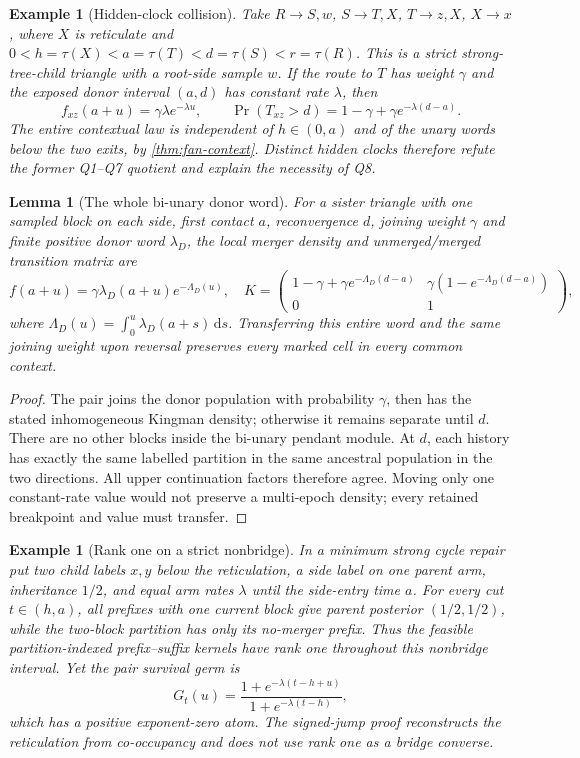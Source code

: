 \documentclass[11pt]{article}
\newtheorem{lemma}[theorem]{Lemma}
\newtheorem{example}[theorem]{Example}
\newcommand{\dd}{\,\mathrm d}
\begin{document}
\begin{example}[Hidden-clock collision]
\label{ex:hidden-routing-time}
Take $R\to S,w$, $S\to T,X$, $T\to z,X$, $X\to x$, where $X$ is reticulate and $0<h=\tau(X)<a=\tau(T)<d=\tau(S)<r=\tau(R)$. This is a strict strong-tree-child triangle with a root-side sample $w$. If the route to $T$ has weight $\gamma$ and the exposed donor interval $(a,d)$ has constant rate $\lambda$, then
\[
 f_{xz}(a+u)=\gamma\lambda e^{-\lambda u},\qquad
 \Pr(T_{xz}>d)=1-\gamma+\gamma e^{-\lambda(d-a)}.
\]
The entire contextual law is independent of $h\in(0,a)$ and of the unary words below the two exits, by \cref{thm:fan-context}. Distinct hidden clocks therefore refute the former Q1--Q7 quotient and explain the necessity of Q8.
\end{example}

\begin{lemma}[The whole bi-unary donor word]
\label{thm:biunary}
For a sister triangle with one sampled block on each side, first contact $a$, reconvergence $d$, joining weight $\gamma$ and finite positive donor word $\lambda_D$, the local merger density and unmerged/merged transition matrix are
\[
 f(a+u)=\gamma\lambda_D(a+u)e^{-\Lambda_D(u)},\quad
 K=\begin{pmatrix}1-\gamma+\gamma e^{-\Lambda_D(d-a)}&\gamma(1-e^{-\Lambda_D(d-a)})\\0&1\end{pmatrix},
\]
where $\Lambda_D(u)=\int_0^u\lambda_D(a+s)\dd s$. Transferring this entire word and the same joining weight upon reversal preserves every marked cell in every common context.
\end{lemma}
\begin{proof}
The pair joins the donor population with probability $\gamma$, then has the stated inhomogeneous Kingman density; otherwise it remains separate until $d$. There are no other blocks inside the bi-unary pendant module. At $d$, each history has exactly the same labelled partition in the same ancestral population in the two directions. All upper continuation factors therefore agree. Moving only one constant-rate value would not preserve a multi-epoch density; every retained breakpoint and value must transfer.
\end{proof}

\begin{example}[Rank one on a strict nonbridge]
\label{ex:rank-one}
In a minimum strong cycle repair put two child labels $x,y$ below the reticulation, a side label on one parent arm, inheritance $1/2$, and equal arm rates $\lambda$ until the side-entry time $a$. For every cut $t\in(h,a)$, all prefixes with one current block give parent posterior $(1/2,1/2)$, while the two-block partition has only its no-merger prefix. Thus the feasible partition-indexed prefix--suffix kernels have rank one throughout this nonbridge interval. Yet the pair survival germ is
\[
 G_t(u)=\frac{1+e^{-\lambda(t-h+u)}}{1+e^{-\lambda(t-h)}},
\]
which has a positive exponent-zero atom. The signed-jump proof reconstructs the reticulation from co-occupancy and does not use rank one as a bridge converse.
\end{example}
\end{document}
